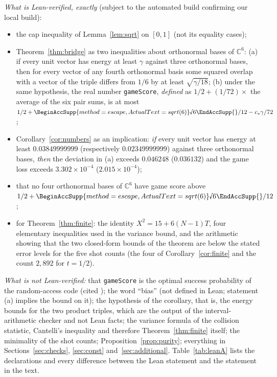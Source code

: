 \documentclass[11pt]{article}
\newcommand{\rnum}[1]{\BeginAccSupp{method=escape,ActualText=sqrt(#1)}\text{\textsurd}#1\EndAccSupp{}}
\newcommand{\rsix}{\rnum{6}}
\newcommand{\C}{\mathbb{C}}
\newcommand{\cstar}{c_\ast}              %
\theoremstyle{definition}
\theoremstyle{remark}
\begin{document}
\emph{What is Lean-verified, exactly} (subject to the automated build confirming our local build):
\begin{itemize}
\item the cap inequality of Lemma~\ref{lem:sqrt} on $[0,1]$ (not its equality cases);
\item Theorem~\ref{thm:bridge} as two inequalities about orthonormal bases of $\C^6$: (a) if every unit vector has
energy at least $\gamma$ against three orthonormal bases, then for every vector of any fourth orthonormal basis
some squared overlap with a vector of the triple differs from $1/6$ by at least $\sqrt{\gamma/18}$; (b) under the
same hypothesis, the real number \texttt{gameScore}, \emph{defined} as $1/2+(1/72)\times$ the average of the six
pair sums, is at most $1/2+\rsix/12-\cstar\gamma/72$;
\item Corollary~\ref{cor:numbers} as an implication: \emph{if} every unit vector has energy at least
$0.03849999999$ (respectively $0.02349999999$) against three orthonormal bases, \emph{then} the deviation in (a)
exceeds $0.046248$ ($0.036132$) and the game loss exceeds $3.302\times10^{-4}$ ($2.015\times10^{-4}$);
\item that no four orthonormal bases of $\C^6$ have game score above $1/2+\rsix/12$;
\item for Theorem~\ref{thm:finite}: the identity $X^2=15+6(N-1)T$, four elementary inequalities used in the
variance bound, and the arithmetic showing that the two closed-form bounds of the theorem are below the stated
error levels for the five shot counts (the four of Corollary~\ref{cor:finite} and the count $2{,}892$ for $t=1/2$).
\end{itemize}
\emph{What is not Lean-verified:} that \texttt{gameScore} is the optimal success probability of the random-access
code (cited \cite{ABMP}); the word ``bias'' (not defined in Lean; statement (a) implies the bound on it); the
hypothesis of the corollary, that is, the energy bounds for the two product triples, which are the output of the
interval-arithmetic checker and not Lean facts; the variance formula of the collision statistic, Cantelli's
inequality and therefore Theorem~\ref{thm:finite} itself; the minimality of the shot counts;
Proposition~\ref{prop:purity}; everything in Sections~\ref{sec:checks}, \ref{sec:const}
and~\ref{sec:additional}. Table~\ref{tab:leanA} lists the declarations and every difference between the Lean
statement and the statement in the text.
\end{document}
